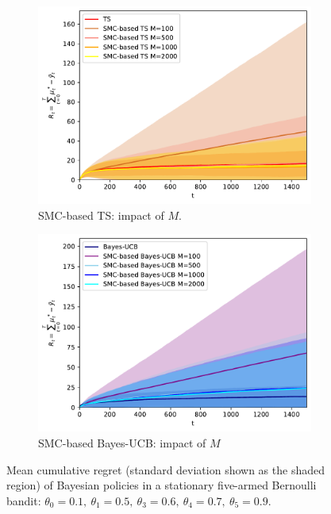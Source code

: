 \begin{figure}[!h]
	\begin{subfigure}[b]{0.46\textwidth}
		\centering
		\includegraphics[width=\textwidth]{./fods_figs/static/bernoulli/A5/theta0.1_0.5_0.6_0.7_0.9_allM_cumulative_regret_ts}
		\caption{SMC-based TS: impact of $M$.}
	\end{subfigure}
	\begin{subfigure}[b]{0.46\textwidth}
		\centering
		\includegraphics[width=\textwidth]{./fods_figs/static/bernoulli/A5/theta0.1_0.5_0.6_0.7_0.9_allM_cumulative_regret_bucb}
		\caption{SMC-based Bayes-UCB: impact of $M$}
	\end{subfigure}
	
	\caption{Mean cumulative regret (standard deviation shown as the shaded region) of Bayesian policies in a stationary five-armed Bernoulli bandit:
		 $\theta_0=0.1, \ \theta_1=0.5, \ \theta_3=0.6, \ \theta_4=0.7, \ \theta_5=0.9$.
	}
\end{figure}

